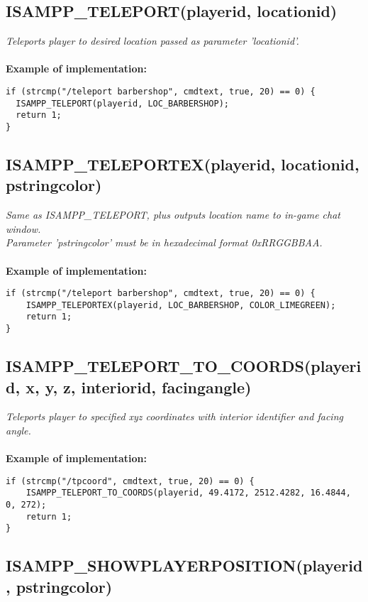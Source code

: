 \documentclass{article}
\begin{document}
\subsection{ISAMPP\_TELEPORT(playerid, locationid)}

\textit{Teleports player to desired location passed as parameter 'locationid'.}
\\
\\
\textbf{Example of implementation:}
\begin{verbatim}
if (strcmp("/teleport barbershop", cmdtext, true, 20) == 0) {
  ISAMPP_TELEPORT(playerid, LOC_BARBERSHOP);
  return 1;
}
\end{verbatim}


\subsection{ISAMPP\_TELEPORTEX(playerid, locationid, pstringcolor)}

\textit{Same as ISAMPP\_TELEPORT, plus outputs location name to in-game chat window. \\Parameter 'pstringcolor' must be in hexadecimal format 0xRRGGBBAA.}
\\
\\
\textbf{Example of implementation:}
\begin{verbatim}
if (strcmp("/teleport barbershop", cmdtext, true, 20) == 0) {
    ISAMPP_TELEPORTEX(playerid, LOC_BARBERSHOP, COLOR_LIMEGREEN);
    return 1;
}
\end{verbatim}


\subsection{ISAMPP\_TELEPORT\_TO\_COORDS(playerid, x, y, z, interiorid, facingangle)}

\textit{Teleports player to specified xyz coordinates with interior identifier and facing angle.}
\\
\\
\textbf{Example of implementation:}
\begin{verbatim}
if (strcmp("/tpcoord", cmdtext, true, 20) == 0) {
    ISAMPP_TELEPORT_TO_COORDS(playerid, 49.4172, 2512.4282, 16.4844, 0, 272);
    return 1;
}
\end{verbatim}


\newpage
\subsection{ISAMPP\_SHOWPLAYERPOSITION(playerid, pstringcolor)}
\end{document}
